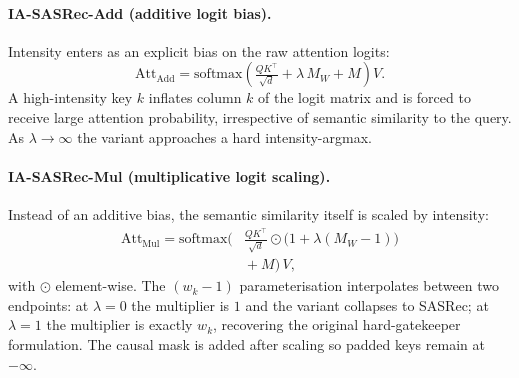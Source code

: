 \paragraph{IA-SASRec-Add (additive logit bias).}
Intensity enters as an explicit bias on the raw attention logits:
\begin{equation}
\mathrm{Att}_{\mathrm{Add}} = \mathrm{softmax}\!\left(\tfrac{QK^{\top}}{\sqrt{d}} + \lambda\, M_W + M\right) V.
\label{eq:add}
\end{equation}
A high-intensity key $k$ inflates column $k$ of the logit matrix and is
forced to receive large attention probability, irrespective of semantic
similarity to the query. As $\lambda \to \infty$ the variant approaches
a hard intensity-argmax.

\paragraph{IA-SASRec-Mul (multiplicative logit scaling).}
Instead of an additive bias, the semantic similarity itself is scaled
by intensity:
\begin{equation}
\begin{aligned}
\mathrm{Att}_{\mathrm{Mul}} = \mathrm{softmax}\Big(
  & \tfrac{QK^{\top}}{\sqrt{d}} \odot \big(1 + \lambda(M_W - 1)\big) \\
  & {} + M \Big)\, V,
\end{aligned}
\label{eq:mul}
\end{equation}
with $\odot$ element-wise. The $(w_k - 1)$ parameterisation interpolates
between two endpoints: at $\lambda = 0$ the multiplier is $1$ and the
variant collapses to SASRec; at $\lambda = 1$ the multiplier is exactly
$w_k$, recovering the original hard-gatekeeper formulation. The causal
mask is added after scaling so padded keys remain at $-\infty$.

